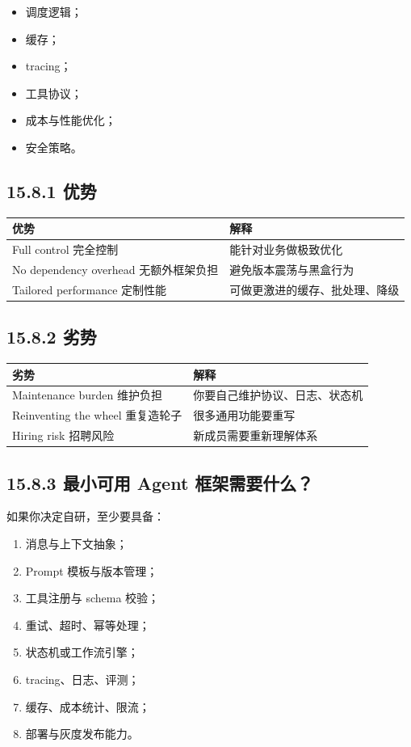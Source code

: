 \begin{itemize}[leftmargin=2em]
\item 调度逻辑；
\item 缓存；
\item tracing；
\item 工具协议；
\item 成本与性能优化；
\item 安全策略。
\end{itemize}

\subsection{15.8.1 优势}

\begingroup
\scriptsize
\setlength{\tabcolsep}{3pt}
\begin{longtable}{|p{}|p{}|}
\hline
优势 & 解释 \\ \hline
Full control 完全控制 & 能针对业务做极致优化 \\ \hline
No dependency overhead 无额外框架负担 & 避免版本震荡与黑盒行为 \\ \hline
Tailored performance 定制性能 & 可做更激进的缓存、批处理、降级 \\ \hline
\end{longtable}
\endgroup

\subsection{15.8.2 劣势}

\begingroup
\scriptsize
\setlength{\tabcolsep}{3pt}
\begin{longtable}{|p{}|p{}|}
\hline
劣势 & 解释 \\ \hline
Maintenance burden 维护负担 & 你要自己维护协议、日志、状态机 \\ \hline
Reinventing the wheel 重复造轮子 & 很多通用功能要重写 \\ \hline
Hiring risk 招聘风险 & 新成员需要重新理解体系 \\ \hline
\end{longtable}
\endgroup

\subsection{15.8.3 最小可用 Agent 框架需要什么？}

如果你决定自研，至少要具备：


\begin{enumerate}[leftmargin=2em]
\item 消息与上下文抽象；
\item Prompt 模板与版本管理；
\item 工具注册与 schema 校验；
\item 重试、超时、幂等处理；
\item 状态机或工作流引擎；
\item tracing、日志、评测；
\item 缓存、成本统计、限流；
\item 部署与灰度发布能力。
\end{enumerate}

